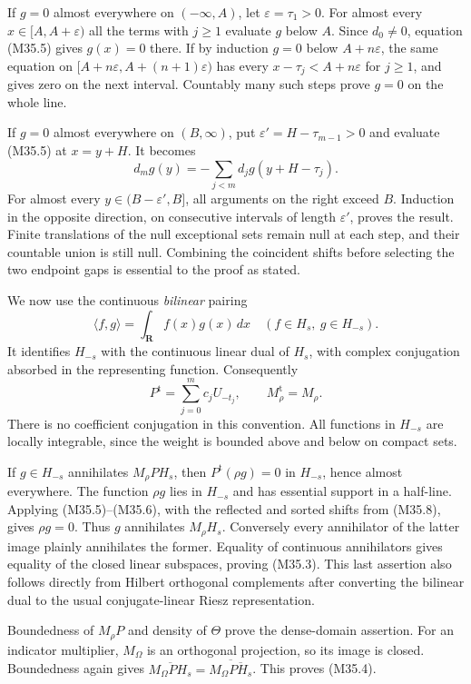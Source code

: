 If $g=0$ almost everywhere on $(-\infty,A)$, let
$\varepsilon=\tau_1>0$.  For almost every
$x\in[A,A+\varepsilon)$ all the terms with $j\ge1$
evaluate $g$ below $A$.  Since $d_0\ne0$, equation
(M35.5) gives $g(x)=0$ there.  If by induction $g=0$
below $A+n\varepsilon$, the same equation on
$[A+n\varepsilon,A+(n+1)\varepsilon)$ has every
$x-\tau_j<A+n\varepsilon$ for $j\ge1$, and gives
zero on the next interval.  Countably many such steps
prove $g=0$ on the whole line.

If $g=0$ almost everywhere on $(B,\infty)$, put
$\varepsilon'=H-\tau_{m-1}>0$ and evaluate (M35.5)
at $x=y+H$.  It becomes
\[
 d_mg(y)=-\sum_{j<m}d_jg(y+H-\tau_j).
 \tag{M35.6}
\]
For almost every $y\in(B-\varepsilon',B]$, all
arguments on the right exceed $B$.  Induction in the
opposite direction, on consecutive intervals of length
$\varepsilon'$, proves the result.  Finite translations
of the null exceptional sets remain null at each step,
and their countable union is still null.  Combining the
coincident shifts before selecting the two endpoint gaps
is essential to the proof as stated.

We now use the continuous \emph{bilinear} pairing
\[
            \langle f,g\rangle=\int_{\mathbf R}f(x)g(x)\,dx
             \quad (f\in H_s,\ g\in H_{-s}).
 \tag{M35.7}
\]
It identifies $H_{-s}$ with the continuous linear dual
of $H_s$, with complex conjugation absorbed in the
representing function.  Consequently
\[
              P^{\mathrm t}=\sum_{j=0}^{m}c_jU_{-t_j},
              \qquad M_\rho^{\mathrm t}=M_\rho.
 \tag{M35.8}
\]
There is no coefficient conjugation in this convention.
All functions in $H_{-s}$ are locally integrable, since
the weight is bounded above and below on compact sets.

If $g\in H_{-s}$ annihilates $M_\rho PH_s$, then
$P^{\mathrm t}(\rho g)=0$ in $H_{-s}$, hence almost
everywhere.  The function $\rho g$ lies in $H_{-s}$ and
has essential support in a half-line.  Applying
(M35.5)--(M35.6), with the reflected and sorted shifts
from (M35.8), gives $\rho g=0$.  Thus $g$ annihilates
$M_\rho H_s$.  Conversely every annihilator of the
latter image plainly annihilates the former.  Equality
of continuous annihilators gives equality of the closed
linear subspaces, proving (M35.3).  This last assertion
also follows directly from Hilbert orthogonal
complements after converting the bilinear dual to the
usual conjugate-linear Riesz representation.

Boundedness of $M_\rho P$ and density of $\Theta$ prove
the dense-domain assertion.  For an indicator multiplier,
$M_\Omega$ is an orthogonal projection, so its image is
closed.  Boundedness again gives
$\overline{M_\Omega PH_s}=
\overline{M_\Omega\overline{PH_s}}$.
This proves (M35.4).

